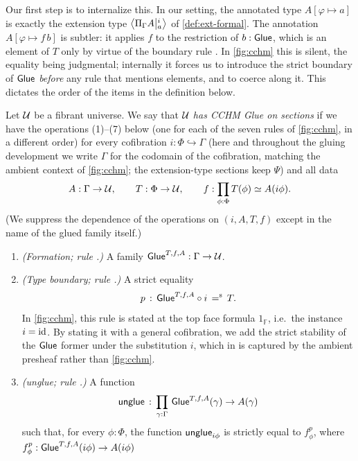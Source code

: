 \vspace*{.5cm}

Our first step is to internalize this.
In our setting, the annotated type $A[\varphi \mapsto a]$ is exactly the
extension type $\Ext{i}{\Pi_\Gamma A}{a}$ of \cref{def:ext-formal}.
The annotation $A[\varphi \mapsto f\,b]$ is subtler: it applies $f$ to the
restriction of $b : \Glue$, which is an element of $T$ only by virtue of the
boundary rule . In \cref{fig:cchm}
this is silent, the equality being judgmental; internally it forces us to
introduce the strict boundary of $\Glue$ \emph{before} any rule that mentions
elements, and to coerce along it. This dictates the order of the items in the definition below.

\begin{definition}\label{def:literally-translated-glue-rules}
	Let $\UU$ be a fibrant universe. We say that $\UU$ \emph{has CCHM Glue on sections} if we
	have the operations (1)--(7) below (one for each of the seven rules of
	\cref{fig:cchm}, in a different order) for every cofibration
	$i : \Phi \hookrightarrow \Gamma$ (here and throughout the gluing
	development we write $\Gamma$ for the codomain of the cofibration,
	matching the ambient context of \cref{fig:cchm}; the extension-type sections
	keep $\Psi$) and all data
	\[
	A:\Gamma\to\UU,
	\qquad
	T:\Phi\to\UU,
	\qquad
	f:\prod_{\phi:\Phi} T(\phi)\simeq A(i\phi).
	\]
	(We suppress the dependence of the operations on $(i,A,T,f)$ except in the
	name of the glued family itself.)
	\begin{enumerate}
		\item \emph{(Formation; rule .)} A family
		$\Glue^{T,f,A} : \Gamma\to\UU$.
		\item \emph{(Type boundary; rule .)} A strict equality
		\[
		p \,:\, \Glue^{T,f,A}\circ i \,\seq\, T.
		\]
		In \cref{fig:cchm}, this rule is stated at the top face formula
		$1_\mathbb{F}$, i.e.\ the instance $i=\id$. By stating it with
		a general cofibration, we add the strict
		stability of the $\Glue$ former under the substitution $i$, which
		in \citet{CCHM2018} is captured by the ambient presheaf rather than \cref{fig:cchm}.
		\item \emph{(unglue; rule .)} A function
		\[
		\unglue \,:\, \prod_{\gamma:\Gamma}\, \Glue^{T,f,A}(\gamma) \to A(\gamma)
		\]
		such that, for every $\phi:\Phi$, the function $\unglue_{i\phi}$ is strictly
		equal to $f^p_\phi$, where $f^p_\phi : \Glue^{T,f,A}(i\phi)\to A(i\phi)$

\end{enumerate}
\end{definition}
